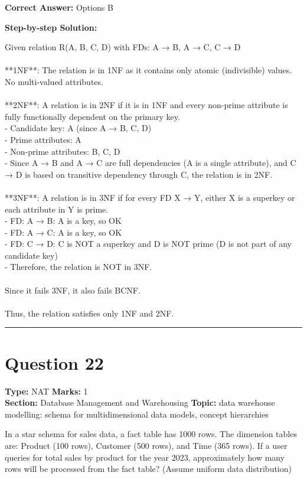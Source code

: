 \documentclass[11pt]{article}
\begin{document}
\textbf{Correct Answer:} Options B

\textbf{Step-by-step Solution:}

Given relation R(A, B, C, D) with FDs: A → B, A → C, C → D\\
\\
**1NF**: The relation is in 1NF as it contains only atomic (indivisible) values. No multi-valued attributes.\\
\\
**2NF**: A relation is in 2NF if it is in 1NF and every non-prime attribute is fully functionally dependent on the primary key.\\
- Candidate key: A (since A → B, C, D)\\
- Prime attributes: A\\
- Non-prime attributes: B, C, D\\
- Since A → B and A → C are full dependencies (A is a single attribute), and C → D is based on transitive dependency through C, the relation is in 2NF.\\
\\
**3NF**: A relation is in 3NF if for every FD X → Y, either X is a superkey or each attribute in Y is prime.\\
- FD: A → B: A is a key, so OK\\
- FD: A → C: A is a key, so OK\\
- FD: C → D: C is NOT a superkey and D is NOT prime (D is not part of any candidate key)\\
- Therefore, the relation is NOT in 3NF.\\
\\
Since it fails 3NF, it also fails BCNF.\\
\\
Thus, the relation satisfies only 1NF and 2NF.

\vspace{0.8em}
\hrule
\vspace{0.4em}
\section*{Question 22}
\textbf{Type:} NAT \hfill \textbf{Marks:} 1\\
\textbf{Section:} Database Management and Warehousing \hfill \textbf{Topic:} data warehouse modelling: schema for multidimensional data models, concept hierarchies

In a star schema for sales data, a fact table has 1000 rows. The dimension tables are: Product (100 rows), Customer (500 rows), and Time (365 rows). If a user queries for total sales by product for the year 2023, approximately how many rows will be processed from the fact table? (Assume uniform data distribution)
\end{document}
